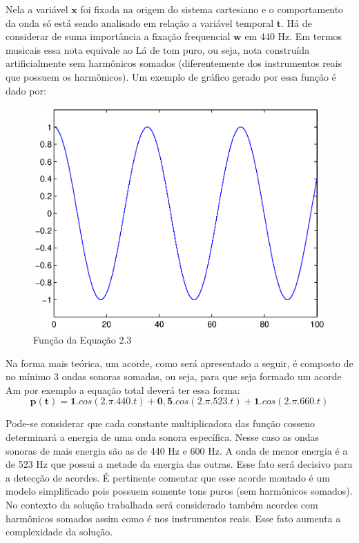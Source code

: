 \newpage
Nela a variável $\textbf{x}$ foi fixada na origem do sistema cartesiano e o comportamento da onda só está sendo analisado em relação a variável temporal $\textbf{t}$. Há de considerar de suma importância a fixação frequencial $\textbf{w}$ em 440 Hz. Em termos musicais essa nota equivale ao Lá de tom puro, ou seja, nota construída artificialmente sem harmônicos somados (diferentemente dos instrumentos reais que possuem os harmônicos). Um exemplo de gráfico gerado por essa função é dado por:
\begin{figure}[h]
	\centering
		\includegraphics[scale=0.7]{figuras/cos440.eps}
	\caption{Função da Equação 2.3}
\end{figure}

Na forma mais teórica, um acorde, como será apresentado a seguir, é composto de no mínimo 3 ondas sonoras somadas, ou seja, para que seja formado um acorde Am por exemplo a equação total deverá ter essa forma:
\begin{equation}
\label{eqn04}
	\mathbf{p(t)} = \mathbf{1}.{cos}(2.\pi.440.t) + \mathbf{0,5}.{cos}(2.\pi.523.t) + \mathbf{1}.{cos}(2.\pi.660.t)
\end{equation}

Pode-se considerar que cada constante multiplicadora das função cosseno determinará a energia de uma onda sonora específica. Nesse caso as ondas sonoras de mais energia são as de 440 Hz e 600 Hz. A onda de menor energia é a de 523 Hz que possui a metade da energia das outras. Esse fato será decisivo para a detecção de acordes. É pertinente comentar que esse acorde montado é um modelo simplificado pois possuem somente tons puros (sem harmônicos somados). No contexto da solução trabalhada será considerado também acordes com harmônicos somados assim como é nos instrumentos reais. Esse fato aumenta a complexidade da solução.

